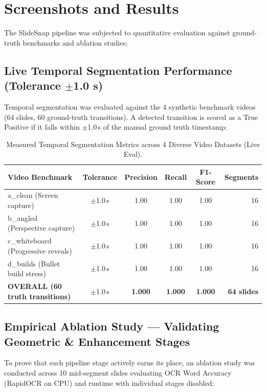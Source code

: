 \documentclass[10pt,a4paper]{article}
\begin{document}
\section{Screenshots and Results}

The SlideSnap pipeline was subjected to quantitative evaluation against ground-truth benchmarks and ablation studies:

\subsection{Live Temporal Segmentation Performance (Tolerance $\pm$1.0 s)}
Temporal segmentation was evaluated against the 4 synthetic benchmark videos (64 slides, 60 ground-truth transitions). A detected transition is scored as a True Positive if it falls within $\pm$1.0\,s of the manual ground truth timestamp:

\begin{table}[h!]
\small
\centering
\begin{tabularx}{\textwidth}{@{} l c c c c r @{}}
\toprule
\rowcolor{navy}\color{white}\textbf{Video Benchmark} & \color{white}\textbf{Tolerance} & \color{white}\textbf{Precision} & \color{white}\textbf{Recall} & \color{white}\textbf{F1-Score} & \color{white}\textbf{Segments} \\
\midrule
a\_clean (Screen capture) & $\pm$1.0\,s & 1.00 & 1.00 & 1.00 & 16 \\
b\_angled (Perspective capture) & $\pm$1.0\,s & 1.00 & 1.00 & 1.00 & 16 \\
c\_whiteboard (Progressive reveals) & $\pm$1.0\,s & 1.00 & 1.00 & 1.00 & 16 \\
d\_builds (Bullet build stress) & $\pm$1.0\,s & 1.00 & 1.00 & 1.00 & 16 \\
\midrule
\textbf{OVERALL (60 truth transitions)} & $\pm$1.0\,s & \textbf{1.000} & \textbf{1.000} & \textbf{1.000} & \textbf{64 slides} \\
\bottomrule
\end{tabularx}
\caption{Measured Temporal Segmentation Metrics across 4 Diverse Video Datasets (Live Eval).}
\end{table}

\subsection{Empirical Ablation Study — Validating Geometric \& Enhancement Stages}
To prove that each pipeline stage actively earns its place, an ablation study was conducted across 10 mid-segment slides evaluating OCR Word Accuracy (RapidOCR on CPU) and runtime with individual stages disabled:
\end{document}
